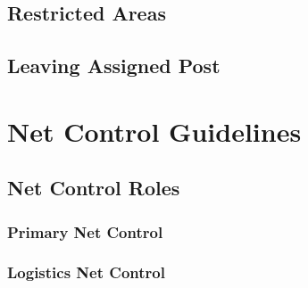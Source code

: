 \documentclass[pdflatex,letterpaper,twoside,12pt]{book}
\begin{document}

\section{Restricted Areas}


\section{Leaving Assigned Post}


\chapter{Net Control Guidelines}


\section{Net Control Roles}

\subsection{Primary Net Control}

\iffalse %
Describe role, types of traffic, etc
\fi

\subsection{Logistics Net Control}

\iffalse %
Describe role, types of traffic, etc
\fi
\end{document}
